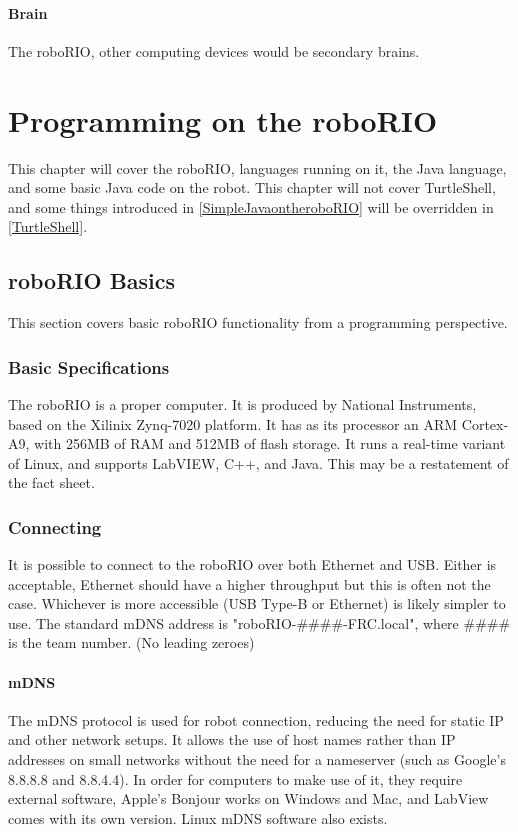 \documentclass[]{report}
\begin{document}
\subsubsection*{Brain}
The roboRIO, other computing devices would be secondary brains.



\chapter{Programming on the roboRIO}
This chapter will cover the roboRIO, languages running on it, the Java language,
and some basic Java code on the robot.
This chapter will not cover TurtleShell, and some things introduced in \ref{SimpleJavaontheroboRIO} will be overridden in \ref{TurtleShell}.


\section{roboRIO Basics}
This section covers basic roboRIO functionality from a programming perspective.

\subsection{Basic Specifications}
The roboRIO is a proper computer.
It is produced by National Instruments, based on the Xilinix\goodcopyright{} Zynq\trademark{}-7020 platform.
It has as its processor an ARM Cortex\trademark{}-A9, with 256MB of RAM and 512MB of flash storage.
It runs a real-time variant of Linux, and supports LabVIEW, C++, and Java.
This may be a restatement of the fact sheet.

\subsection{Connecting}
It is possible to connect to the roboRIO over both Ethernet and USB.
Either is acceptable, Ethernet should have a higher throughput but this is often not the case.
Whichever is more accessible (USB Type-B or Ethernet) is likely simpler to use.
The standard mDNS address is "roboRIO-\#\#\#\#-FRC.local", where \#\#\#\# is the team number. (No leading zeroes)

\subsubsection{mDNS}
The mDNS protocol is used for robot connection, reducing the need for static IP and other network setups.
It allows the use of host names rather than IP addresses on small networks without the need for a nameserver (such as Google's 8.8.8.8 and 8.8.4.4).
In order for computers to make use of it, they require external software, Apple's Bonjour works on Windows and Mac, and LabView comes with its own version.
Linux mDNS software also exists.
\end{document}

